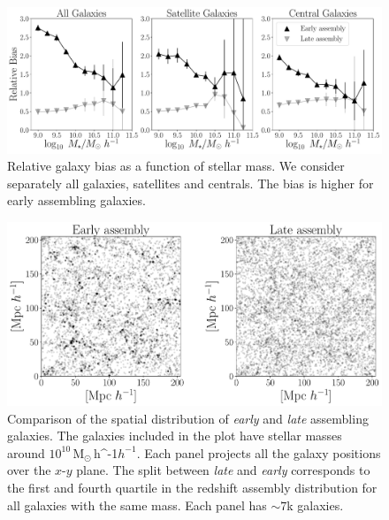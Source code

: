\documentclass[fleqn,usenatbib]{mnras}
\newcommand{\Msunh}{\,{\rm M}$_{\odot}$\,\ifmmode h^{-1}\else $h^{-1}$\fi}
\begin{document}
\begin{figure}
    \centering
    \includegraphics[width=2.0\columnwidth]{figuras/bias_galaxies.pdf}
    \caption{Relative galaxy bias as a function of stellar mass.
    We consider separately all galaxies, satellites and centrals.
    The bias is higher for early assembling galaxies.}
    \label{fig:galaxy_bias}
\end{figure}

\begin{figure}
    \centering
    \includegraphics[width=1.8\columnwidth]{figuras/scatter_assembly.pdf}
    \caption{Comparison of the spatial distribution of \emph{early}
      and \emph{late} assembling galaxies. 
    The galaxies included in the plot have stellar masses around
    $10^{10}$\Msunh.  
    Each panel projects all the galaxy positions over the $x$-$y$
    plane.  
    The split between \emph{late} and \emph{early} corresponds to the
    first and fourth quartile in the redshift assembly distribution
    for all galaxies with the same mass. 
    Each panel has $\sim7$k galaxies. }
    \label{fig:comparison}
\end{figure}
\end{document}
